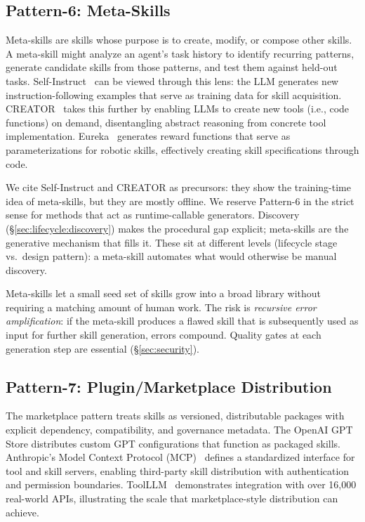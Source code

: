 \documentclass[conference, compsoc]{IEEEtran}
\theoremstyle{plain}
\begin{document}
\subsection{Pattern-6: Meta-Skills}
\label{sec:patterns:meta}

Meta-skills are skills whose purpose is to create, modify, or compose other skills. A meta-skill might analyze an agent's task history to identify recurring patterns, generate candidate skills from those patterns, and test them against held-out tasks. Self-Instruct~\cite{wang2023selfinstruct} can be viewed through this lens: the LLM generates new instruction-following examples that serve as training data for skill acquisition. CREATOR~\cite{qian2023creator} takes this further by enabling LLMs to create new tools (i.e., code functions) on demand, disentangling abstract reasoning from concrete tool implementation. Eureka~\cite{ma2024eureka} generates reward functions that serve as parameterizations for robotic skills, effectively creating skill specifications through code.

We cite Self-Instruct and CREATOR as precursors: they show the training-time idea of meta-skills, but they are mostly offline. We reserve Pattern-6 in the strict sense for methods that act as runtime-callable generators. Discovery (\S\ref{sec:lifecycle:discovery}) makes the procedural gap explicit; meta-skills are the generative mechanism that fills it. These sit at different levels (lifecycle stage vs.\ design pattern): a meta-skill automates what would otherwise be manual discovery.

Meta-skills let a small seed set of skills grow into a broad library without requiring a matching amount of human work. The risk is \emph{recursive error amplification}: if the meta-skill produces a flawed skill that is subsequently used as input for further skill generation, errors compound. Quality gates at each generation step are essential (\S\ref{sec:security}).

\subsection{Pattern-7: Plugin/Marketplace Distribution}
\label{sec:patterns:marketplace}

The marketplace pattern treats skills as versioned, distributable packages with explicit dependency, compatibility, and governance metadata. The OpenAI GPT Store distributes custom GPT configurations that function as packaged skills. Anthropic's Model Context Protocol (MCP)~\cite{anthropic2024mcp} defines a standardized interface for tool and skill servers, enabling third-party skill distribution with authentication and permission boundaries. ToolLLM~\cite{qin2024toolllm} demonstrates integration with over 16,000 real-world APIs, illustrating the scale that marketplace-style distribution can achieve.
\end{document}
